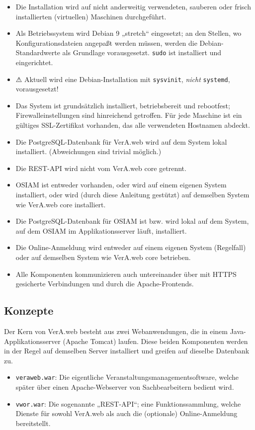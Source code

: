 \documentclass{tarentanleitung}
\begin{document}
\begin{itemize}
 \item{Die Installation wird auf nicht anderweitig verwendeten,
  sauberen oder frisch installierten (virtuellen) Maschinen durchgeführt.}
 \item{Als Betriebssystem wird Debian 9 „stretch“ eingesetzt; an den
  Stellen, wo Konfigurationsdateien angepaßt werden müssen, werden die
  Debian-Standardwerte als Grundlage vorausgesetzt. \texttt{sudo} ist
  installiert und eingerichtet.}
 \item{⚠ Aktuell wird eine Debian-Installation mit \texttt{sysvinit},
  \emph{nicht} \texttt{systemd}, vorausgesetzt!}
 \item{Das System ist grundsätzlich installiert, betriebsbereit
  und rebootfest; Firewalleinstellungen sind hinreichend getroffen.
  Für jede Maschine ist ein gültiges SSL-Zertifikat vorhanden, das
  alle verwendeten Hostnamen abdeckt.}
 \item{Die PostgreSQL-Datenbank für VerA.web wird auf dem System
  lokal installiert. (Abweichungen sind trivial möglich.)}
 \item{Die REST-API wird nicht vom VerA.web core getrennt.}
 \item{OSIAM ist entweder vorhanden, oder wird auf einem eigenen
  System installiert, oder wird (durch diese Anleitung gestützt)
  auf demselben System wie VerA.web core installiert.}
 \item{Die PostgreSQL-Datenbank für OSIAM ist bzw. wird lokal auf
  dem System, auf dem OSIAM im Applikationsserver läuft, installiert.}
 \item{Die Online-Anmeldung wird entweder auf einem eigenen System
  (Regelfall) oder auf demselben System wie VerA.web core betrieben.}
 \item{Alle Komponenten kommunizieren auch untereinander über mit
  HTTPS gesicherte Verbindungen und durch die Apache-Frontends.}
\end{itemize}

\subsection{Konzepte}\label{subsec:concepts}

Der Kern von VerA.web besteht aus zwei Webanwendungen, die in einem
Java-Applikationsserver (Apache Tomcat) laufen. Diese beiden Komponenten
werden in der Regel auf demselben Server installiert und greifen auf
dieselbe Datenbank zu.

\begin{itemize}
 \item{\texttt{veraweb.war}: Die eigentliche Veranstaltungsmanagementsoftware,
  welche später über einen Apache-Webserver von Sachbearbeitern bedient wird.}
 \item{\texttt{vwor.war}: Die sogenannte „REST-API“; eine Funktionssammlung,
  welche Dienste für sowohl VerA.web als auch die (optionale) Online-Anmeldung
  bereitstellt.}
\end{itemize}
\end{document}
